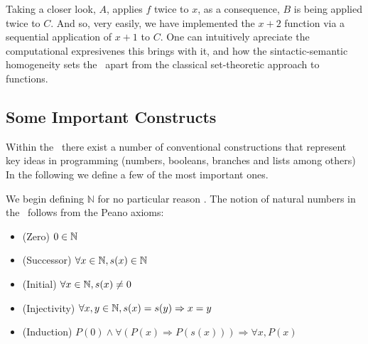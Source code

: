 \documentclass[12pt]{book}
\begin{document}
Taking a closer look, $A$, applies $f$ twice to $x$, as a consequence, $B$ is being applied twice to $C$. And so, very easily, we have implemented the $ x + 2 $ function via a sequential application of $x + 1$ to $C$. One can intuitively apreciate the computational expresivenes this brings with it, and how the sintactic-semantic homogeneity sets the \lcalc \ apart from the classical set-theoretic approach to functions.


\subsection{\centering Some Important Constructs}

Within the \lcalc \ there exist a number of conventional constructions that represent key ideas in programming (numbers, booleans, branches and lists among others) In the following we define a few of the most important ones.

We begin defining $ \mathbb{N} $ for no particular reason . The notion of natural numbers in the \lcalc \ follows from the Peano axioms:
\begin{itemize}
\item (Zero) \( 0 \in \mathbb{N} \)
\item (Successor) \( \forall x \in \mathbb{N}, s(x) \in \mathbb{N} \)
\item (Initial) \( \forall x \in \mathbb{N}, s(x) \neq 0 \)
\item (Injectivity) \( \forall x, y \in \mathbb{N}, s(x) = s(y) \Rightarrow x = y \)
\item (Induction) \( P(0) \land \forall ( P(x) \Rightarrow P(s(x))) \Rightarrow \forall x,  P (x) \)
\end{itemize}
\end{document}
